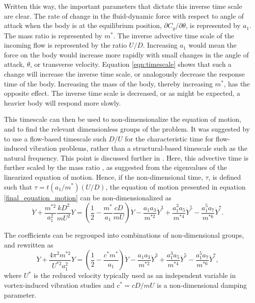Written this way, the important parameters that dictate this inverse time scale are clear. The rate of change in the fluid-dynamic force with respect to angle of attack when the body is at the equilibrium position, $\partial C_y/\partial \theta$, is represented by $a_1$. The mass ratio is represented by $m^*$. The inverse advective time scale of the incoming flow is represented by the ratio $U/D$. Increasing $a_1$ would mean the force on the body would increase more rapidly with small changes in the angle of attack, $\theta$, or transverse velocity. Equation \ref{eqn:timescale} shows that such a change will increase the inverse time scale, or analogously decrease the response time of the body. Increasing the mass of the body, thereby increasing $m^*$, has the opposite effect. The inverse time scale is decreased, or as might be expected, a heavier body will respond more slowly.

This timescale can then be used to non-dimensionalize the equation of motion, and to find the relevant dimensionless groups of the problem. It was suggested by \citet{shiels2001,leonard2001} to use a flow-based timescale such $D/U$ for the characteristic time for flow-induced vibration problems, rather than a structural-based timescale such as the natural frequency. This point is discussed further in \citet{williamson2004}. Here, this advective time is further scaled by the mass ratio \mstar, as suggested from the eigenvalues of the linearized equation of motion. Hence, if the non-dimensional time, $\tau$, is defined such that $\tau=t(a_1/m^*)(U/D)$, the equation of motion presented in equation \ref{final_equation_motion} can be non-dimensionalized as
\begin{equation}
	\label{eqn:eom_nondim}
	\ddot{Y} + \frac{m^{*2}}{a_1^2}\frac{kD^2}{mU^2}Y = \left(\frac{1}{2} - \frac{m^*}{a_1}\frac{cD}{mU}\right)\dot{Y} - \frac{a_1a_3}{m^{*2}}\dot{Y}^3 + \frac{a_1^3a_5}{m^{*4}}\dot{Y}^5 - \frac{a_1^5a_7}{m^{*6}}\dot{Y}^7.
\end{equation}

The coefficients can be regrouped into combinations of non-dimensional groups, and rewritten as
\begin{equation}
	\label{eqn:eom_nondim_regroup}
	\ddot{Y} + \frac{4\pi^{2}m^{*2}}{U^{*2}a_1^2}Y = \left(\frac{1}{2} - \frac{c^*m^*}{a_1}\right)\dot{Y} - \frac{a_1a_3}{m^{*2}}\dot{Y}^3 + \frac{a_1^3a_5}{m^{*4}}\dot{Y}^5 - \frac{a_1^5a_7}{m^{*6}}\dot{Y}^7,
\end{equation}
where $U^{*}$ is the reduced velocity typically used as an independent variable in vortex-induced vibration studies and $c^*=cD/mU$ is a non-dimensional damping parameter.

